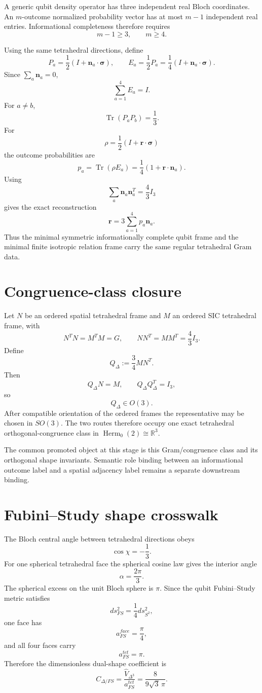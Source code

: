 A generic qubit density operator has three independent real Bloch coordinates.
An \(m\)-outcome normalized probability vector has at most \(m-1\) independent
real entries.  Informational completeness therefore requires
\[
m-1\ge3,
\qquad
\boxed{m\ge4}.
\]

Using the same tetrahedral directions, define
\[
P_a=\frac12(I+\mathbf n_a\cdot\boldsymbol\sigma),
\qquad
E_a=\frac12P_a
=\frac14(I+\mathbf n_a\cdot\boldsymbol\sigma).
\]
Since \(\sum_a\mathbf n_a=0\),
\[
\boxed{\sum_{a=1}^{4}E_a=I}.
\]
For \(a\neq b\),
\[
\boxed{\operatorname{Tr}(P_aP_b)=\frac13}.
\]
For
\[
\rho=\frac12(I+\mathbf r\cdot\boldsymbol\sigma)
\]
the outcome probabilities are
\[
p_a=\operatorname{Tr}(\rho E_a)
=\frac14(1+\mathbf r\cdot\mathbf n_a).
\]
Using
\[
\sum_a\mathbf n_a\mathbf n_a^T=\frac43I_3
\]
gives the exact reconstruction
\[
\boxed{
\mathbf r
=
3\sum_{a=1}^{4}p_a\mathbf n_a.
}
\]
Thus the minimal symmetric informationally complete qubit frame and the minimal
finite isotropic relation frame carry the same regular tetrahedral Gram data.

\section{Congruence-class closure}

Let \(N\) be an ordered spatial tetrahedral frame and \(M\) an ordered SIC
tetrahedral frame, with
\[
N^TN=M^TM=G,
\qquad
NN^T=MM^T=\frac43I_3.
\]
Define
\[
\boxed{Q_{\Delta}:=\frac34MN^T.}
\]
Then
\[
Q_{\Delta}N=M,
\qquad
Q_{\Delta}Q_{\Delta}^T=I_3,
\]
so
\[
\boxed{Q_{\Delta}\in O(3).}
\]
After compatible orientation of the ordered frames the representative may be
chosen in \(SO(3)\).  The two routes therefore occupy one exact tetrahedral
orthogonal-congruence class in
\(\operatorname{Herm}_0(2)\cong\mathbb R^3\).

The common promoted object at this stage is this Gram/congruence class and its
orthogonal shape invariants.  Semantic role binding between an informational
outcome label and a spatial adjacency label remains a separate downstream
binding.

\section{Fubini--Study shape crosswalk}

The Bloch central angle between tetrahedral directions obeys
\[
\cos\chi=-\frac13.
\]
For one spherical tetrahedral face the spherical cosine law gives the interior
angle
\[
\alpha=\frac{2\pi}{3}.
\]
The spherical excess on the unit Bloch sphere is \(\pi\).  Since the qubit
Fubini--Study metric satisfies
\[
ds_{FS}^2=\frac14ds_{S^2}^2,
\]
one face has
\[
\boxed{a_{FS}^{face}=\frac\pi4},
\]
and all four faces carry
\[
\boxed{a_{FS}^{tet}=\pi}.
\]
Therefore the dimensionless dual-shape coefficient is
\[
\boxed{
C_{\Delta/FS}
=
\frac{\hat V_{\Delta^3}}{a_{FS}^{tet}}
=
\frac{8}{9\sqrt3\,\pi}.
}
\]

